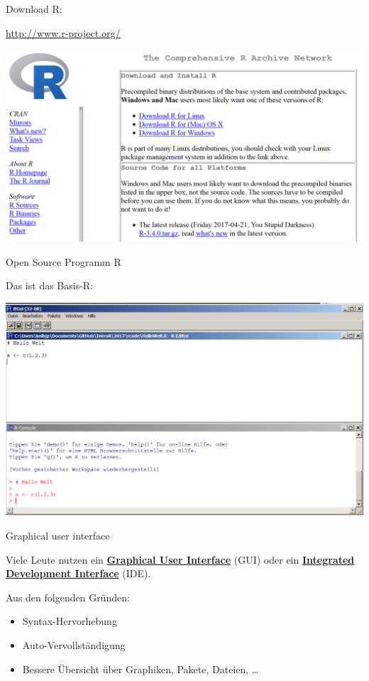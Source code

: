 \documentclass[ignorenonframetext,]{beamer}
\providecommand{\tightlist}{%
  \setlength{\itemsep}{0pt}\setlength{\parskip}{0pt}}
\begin{document}
\begin{frame}{Download R:}

\url{http://www.r-project.org/}

\includegraphics{figure/CRAN1picture.PNG}

\end{frame}

\begin{frame}{Open Source Programm R}

\begin{block}{Das ist das Basis-R:}

\includegraphics{figure/BasisR.PNG}

\end{block}

\end{frame}

\begin{frame}{Graphical user interface}

Viele Leute nutzen ein
\href{https://en.wikipedia.org/wiki/Graphical_user_interface}{\textbf{Graphical
User Interface}} (GUI) oder ein
\href{https://en.wikipedia.org/wiki/Integrated_development_environment}{\textbf{Integrated
Development Interface}} (IDE).

Aus den folgenden Gründen:

\begin{itemize}
\tightlist
\item
  Syntax-Hervorhebung
\item
  Auto-Vervollständigung
\item
  Bessere Übersicht über Graphiken, Pakete, Dateien, \ldots{}
\end{itemize}

\end{frame}
\end{document}
